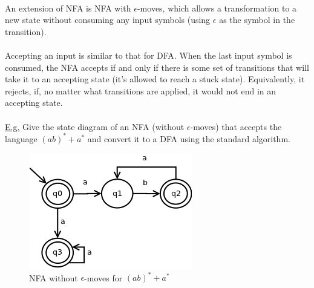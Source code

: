 \documentclass[8pt,letterpaper,twocolumn]{article}
\begin{document}
\\
An extension of NFA is NFA with $\epsilon$-moves, which allows a transformation to a new state
without consuming any input symbols (using $\epsilon$ as the symbol in the transition).\\
\\
Accepting an input is similar to that for DFA.
When the last input symbol is consumed, the NFA accepts if and only if there is some set of
transitions that will take it to an accepting state (it's allowed to reach a stuck state).
Equivalently, it rejects, if, no matter what transitions are applied,
it would not end in an accepting state.\\
\\
\underline{E.g.} Give the state diagram of an NFA (without $\epsilon$-moves)
that accepts the language $(ab)^* + a^*$ and convert it to a DFA using the standard algorithm.

\begin{figure}[h!]
  \centering
    \includegraphics[scale=0.5]{nfa.png}
  \caption{NFA without $\epsilon$-moves for $(ab)^*+a^*$}
  \label{NFA}
\end{figure}
  
\end{document}
